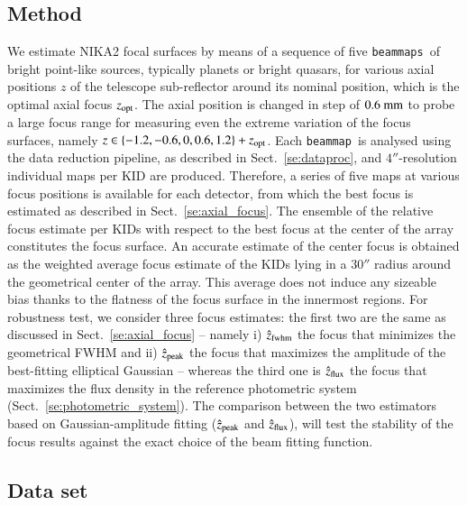 \documentclass[traditionalabstract]{aa}
\newcommand{\bm}{{\tt beammap}}
\newcommand{\bms}{{\tt beammaps}}
\begin{document}
\begin{appendix}
\subsection{Method}

We estimate NIKA2 focal surfaces by means of a sequence of five \bms\ of bright
point-like sources, typically planets or bright quasars, for various
axial positions $z$ of the telescope sub-reflector around its nominal
position, which is the optimal axial focus $z_{\rm{opt}}$. 
The axial position is changed in step of $0.6~\rm{mm}$ to probe a large
focus range for measuring even the extreme variation of the focus surfaces,
namely $z \in \{-1.2, -0.6, 0, 0.6, 1.2 \} + z_{\rm{opt}}$.  Each
\bm\ is analysed using the data reduction pipeline, as described in
Sect.~\ref{se:dataproc}, and $4''$-resolution individual maps per KID
are produced. 
Therefore, a series of
five maps at various focus positions is available for each detector, from which
the best focus is estimated as described in Sect.~\ref{se:axial_focus}. The
ensemble of the relative focus estimate per KIDs with respect to the best focus
at the center of the array constitutes the focus surface. An accurate estimate
of the center focus is obtained as the weighted average focus estimate of the
KIDs lying in a $30''$ radius around the geometrical center of the array. This
average does not induce any sizeable bias thanks to the flatness of the focus
surface in the innermost regions. For robustness test, we consider three focus
estimates: the first two are the same as discussed in
Sect.~\ref{se:axial_focus} -- namely i) $\hat z_{\rm{fwhm}}$ the focus that
minimizes the geometrical FWHM and ii) $\hat z_{\rm{peak}}$ the focus that
maximizes the amplitude of the best-fitting elliptical Gaussian -- whereas the
third one is $\hat z_{\rm{flux}}$ the focus that maximizes the flux
density in the reference photometric system
(Sect.~\ref{se:photometric_system}). The comparison between the two
estimators based on Gaussian-amplitude fitting ($\hat z_{\rm{peak}}$
and $\hat z_{\rm{flux}}$), will test the stability of the focus
results against the exact choice of the beam fitting function.

\subsection{Data set}


\end{appendix}
\end{document}
